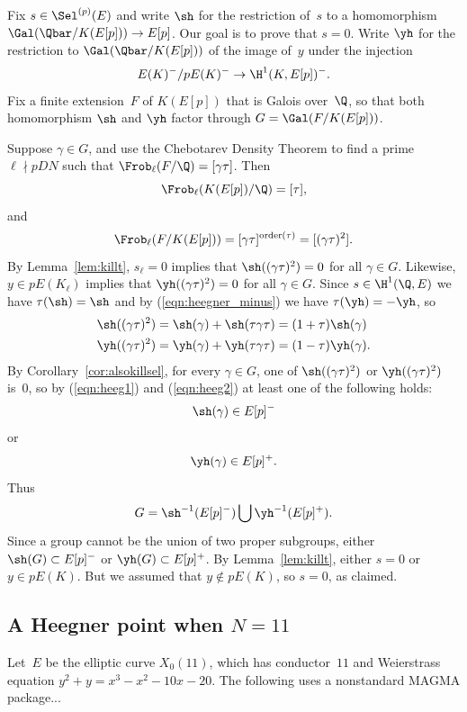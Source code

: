\documentclass{report}
\begin{document}
Fix $s\in \Sel^{(p)}(E)$ and write $\sh$ for the restriction of~$s$ to
a homomorphism $\Gal(\Qbar/K(E[p]))\to{}E[p]$.  Our goal is to prove that
$s=0$.  Write $\yh$ for the restriction to $\Gal(\Qbar/K(E[p]))$
of the image of~$y$ under the injection
\begin{equation}\label{eqn:heegner_minus}
E(K)^-/p E(K)^- \to \H^1(K,E[p])^-.
\end{equation}
Fix a finite extension~$F$ of $K(E[p])$ that is Galois over~$\Q$,
so that both homomorphism $\sh$ and $\yh$ factor through
$G=\Gal(F/K(E[p]))$.

Suppose $\gamma\in G$, and use the Chebotarev Density Theorem to find
a prime $\ell\nmid pDN$ such that $\Frob_\ell(F/\Q)=[\gamma\tau]$.
Then $$\Frob_{\ell}(K(E[p])/\Q)=[\tau],$$ and
$$
\Frob_\ell(F/K(E[p])) = [\gamma\tau]^{\text{order}(\tau)} = [(\gamma\tau)^2].
$$
By Lemma~\ref{lem:killt}, $s_\ell=0$ implies that $\sh((\gamma\tau)^2)=0$
for all $\gamma\in G$.  Likewise, $y\in p E(K_\ell)$ implies that
$\yh((\gamma\tau)^2)=0$ for all $\gamma\in G$.
Since $s\in\H^1(\Q,E)$ we have $\tau(\sh) = \sh$ and
by (\ref{eqn:heegner_minus}) we have $\tau(\yh)=-\yh$, so
\begin{align}\label{eqn:heeg1}
   \sh((\gamma\tau)^2) &= \sh(\gamma) + \sh(\tau\gamma\tau) = (1+\tau)\sh(\gamma)\\\label{eqn:heeg2}
   \yh((\gamma\tau)^2) &= \yh(\gamma) + \yh(\tau\gamma\tau) = (1-\tau)\yh(\gamma).
\end{align}
By Corollary~\ref{cor:alsokillsel}, for every $\gamma\in G$, one of
$\sh((\gamma\tau)^2)$ or $\yh((\gamma\tau)^2)$ is~$0$, so by
(\ref{eqn:heeg1}) and (\ref{eqn:heeg2}) at least one of the following holds:
$$
\sh(\gamma) \in E[p]^-
$$
or
$$
\yh(\gamma) \in E[p]^+.
$$
Thus
$$
  G = \sh^{-1}(E[p]^-) \bigcup \yh^{-1}(E[p]^+).
$$
Since a group cannot be the union of two proper subgroups, either
$\sh(G) \subset E[p]^-$ or $\yh(G)\subset E[p]^+$.
By Lemma~\ref{lem:killt}, either $s=0$ or $y\in p E(K)$.  But we
assumed that $y \not \in p E(K)$, so $s=0$, as claimed.

\subsection{A Heegner point when $N=11$}
Let~$E$ be the elliptic curve $X_0(11)$, which has conductor~$11$
and Weierstrass equation $y^2 + y = x^3 - x^2 - 10x - 20$.
The following uses a nonstandard MAGMA package...
\end{document}
